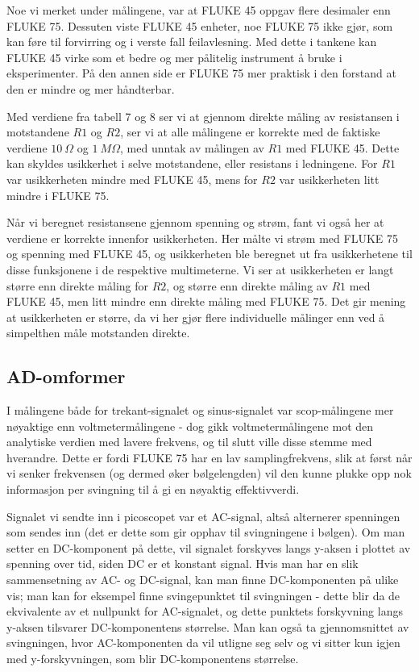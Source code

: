 \documentclass[norsk,a4paper,12pt]{article}
\begin{document}
Noe vi merket under målingene, var at FLUKE 45 oppgav flere desimaler enn FLUKE 75. Dessuten viste FLUKE 45 enheter, noe FLUKE 75 ikke gjør, som kan føre til forvirring og i verste fall feilavlesning. Med dette i tankene kan FLUKE 45 virke som et bedre og mer pålitelig instrument å bruke i eksperimenter. På den annen side er FLUKE 75 mer praktisk i den forstand at den er mindre og mer håndterbar.


Med verdiene fra tabell 7 og 8 ser vi at gjennom direkte måling av resistansen i motstandene $R1$ og $R2$, ser vi at alle målingene er korrekte med de faktiske verdiene $10 \ \Omega$ og $1 \ M\Omega$, med unntak av målingen av $R1$ med FLUKE 45. Dette kan skyldes usikkerhet i selve motstandene, eller resistans i ledningene. For $R1$ var usikkerheten mindre med FLUKE 45, mens for $R2$ var usikkerheten litt mindre i FLUKE 75. 

Når vi beregnet resistansene gjennom spenning og strøm, fant vi også her at verdiene er korrekte innenfor usikkerheten. Her målte vi strøm med FLUKE 75 og spenning med FLUKE 45, og usikkerheten ble beregnet ut fra usikkerhetene til disse funksjonene i de respektive multimeterne. Vi ser at usikkerheten er langt større enn direkte måling for $R2$, og større enn direkte måling av $R1$ med FLUKE 45, men litt mindre enn direkte måling med FLUKE 75. Det gir mening at usikkerheten er større, da vi her gjør flere individuelle målinger enn ved å simpelthen måle motstanden direkte.

\subsection{AD-omformer}

I målingene både for trekant-signalet og sinus-signalet var scop-målingene mer nøyaktige enn voltmetermålingene - dog gikk voltmetermålingene mot den analytiske verdien med lavere frekvens, og til slutt ville disse stemme med hverandre. Dette er fordi FLUKE 75 har en lav samplingfrekvens, slik at først når vi senker frekvensen (og dermed øker bølgelengden) vil den kunne plukke opp nok informasjon per svingning til å gi en nøyaktig effektivverdi. 

Signalet vi sendte inn i picoscopet var et AC-signal, altså alternerer spenningen som sendes inn (det er dette som gir opphav til svingningene i bølgen). Om man setter en DC-komponent på dette, vil signalet forskyves langs y-aksen i plottet av spenning over tid, siden DC er et konstant signal. Hvis man har en slik sammensetning av AC- og DC-signal, kan man finne DC-komponenten på ulike vis; man kan for eksempel finne svingepunktet til svingningen - dette blir da de ekvivalente av et nullpunkt for AC-signalet, og dette punktets forskyvning langs y-aksen tilsvarer DC-komponentens størrelse. Man kan også ta gjennomsnittet av svingningen, hvor AC-komponenten da vil utligne seg selv og vi sitter kun igjen med y-forskyvningen, som blir DC-komponentens størrelse.
\end{document}
